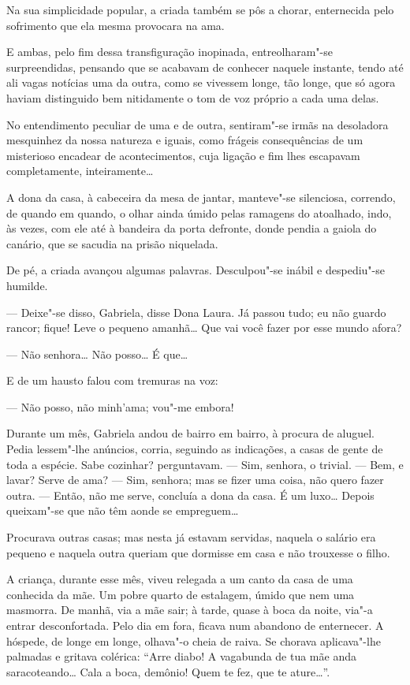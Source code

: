 Na sua simplicidade popular, a criada também se pôs a chorar,
enternecida pelo sofrimento que ela mesma provocara na ama.

E ambas, pelo fim dessa transfiguração inopinada, entreolharam"-se
surpreendidas, pensando que se acabavam de conhecer naquele instante,
tendo até ali vagas notícias uma da outra, como se vivessem longe, tão
longe, que só agora haviam distinguido bem nitidamente o tom de voz
próprio a cada uma delas.

No entendimento peculiar de uma e de outra, sentiram"-se irmãs na
desoladora mesquinhez da nossa natureza e iguais, como frágeis
consequências de um misterioso encadear de acontecimentos, cuja ligação
e fim lhes escapavam completamente, inteiramente\ldots{}

A dona da casa, à cabeceira da mesa de jantar, manteve"-se silenciosa,
correndo, de quando em quando, o olhar ainda úmido pelas ramagens do
atoalhado, indo, às vezes, com ele até à bandeira da porta defronte,
donde pendia a gaiola do canário, que se sacudia na prisão niquelada.

De pé, a criada avançou algumas palavras. Desculpou"-se inábil e
despediu"-se humilde.

--- Deixe"-se disso, Gabriela, disse Dona Laura. Já passou tudo; eu não
guardo rancor; fique! Leve o pequeno amanhã\ldots{} Que vai você fazer
por esse mundo afora?

--- Não senhora\ldots{} Não posso\ldots{} É que\ldots{}

E de um hausto falou com tremuras na voz:

--- Não posso, não minh'ama; vou"-me embora!

Durante um mês, Gabriela andou de bairro em bairro, à procura de
aluguel. Pedia lessem"-lhe anúncios, corria, seguindo as indicações, a
casas de gente de toda a espécie. Sabe cozinhar? perguntavam. --- Sim,
senhora, o trivial. --- Bem, e lavar? Serve de ama? --- Sim, senhora; mas
se fizer uma coisa, não quero fazer outra. --- Então, não me serve,
concluía a dona da casa. É um luxo\ldots{} Depois queixam"-se que não têm
aonde se empreguem\ldots{}

Procurava outras casas; mas nesta já estavam servidas, naquela o salário
era pequeno e naquela outra queriam que dormisse em casa e não trouxesse
o filho.

A criança, durante esse mês, viveu relegada a um canto da casa de uma
conhecida da mãe. Um pobre quarto de estalagem, úmido que nem uma
masmorra. De manhã, via a mãe sair; à tarde, quase à boca da noite,
via"-a entrar desconfortada. Pelo dia em fora, ficava num abandono de
enternecer. A hóspede, de longe em longe, olhava"-o cheia de raiva. Se
chorava aplicava"-lhe palmadas e gritava colérica: ``Arre diabo! A
vagabunda de tua mãe anda saracoteando\ldots{} Cala a boca, demônio!
Quem te fez, que te ature\ldots{}''.

